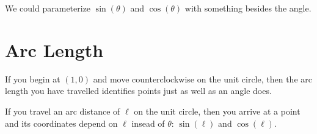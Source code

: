 \documentclass{ximera}
\begin{document}
We could parameterize $\sin(\theta)$ and $\cos(\theta)$ with something besides the angle.



\section{Arc Length}


If you begin at $(1,0)$ and move counterclockwise on the unit circle, then the arc length you have travelled identifies points just as well as an angle does.


If you travel an arc distance of $\ell$ on the unit circle, then you arrive at a point and its coordinates depend on $\ell$ insead of $\theta$: $\sin(\ell)$ and $\cos(\ell)$.
\end{document}
